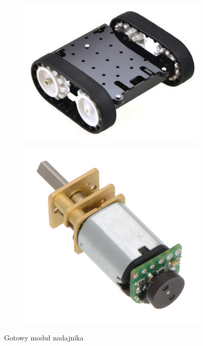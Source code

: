 \documentclass[eng,printmode]{mgr}
\begin{document}
   \begin{figure}[ht]
    \centering
    \begin{subfigure}{.45\textwidth}
     \centering
     \includegraphics[width=1\textwidth]{images/model_mechaniczny}
     \label{fig:model_mechaniczny}
    \end{subfigure}
    \begin{subfigure}{.45\textwidth}
     \centering
     \includegraphics[width=1\textwidth]{images/silnik_enc}
     \label{fig:silnik_enc}
    \end{subfigure}
    \caption{Gotowy moduł nadajnika}
    \label{fig:plytka}
   \end{figure}
\end{document}
